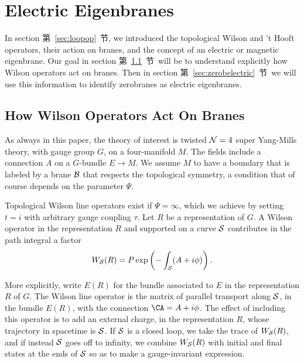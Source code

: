 
\section{Electric Eigenbranes}

\label{sec:electricbranes}

In section 第~\ref{sec:loopop}~节, we introduced the topological Wilson and 't
Hooft operators, their action on branes, and the concept of an
electric or magnetic eigenbrane. Our goal in section 第~\ref{sec:wilbranes}~节\
will be to understand explicitly how Wilson operators act on
branes.  Then in section 第~\ref{sec:zerobelectric}~节\ we will use this
information to identify zerobranes as electric eigenbranes.

\subsection{How Wilson Operators Act On Branes}

\label{sec:wilbranes}

As always in this paper, the theory of interest is  twisted ${\cal
N}=4$ super Yang-Mills theory, with gauge group $G$, on a
four-manifold $M$. The fields include a connection $A$ on a
$G$-bundle $E\to M$. We assume $M$ to have a boundary that is
labeled by a brane ${\cal B}$ that respects the topological
symmetry, a condition that of course depends on the parameter
$\Psi$.

Topological Wilson line operators exist if $\Psi=\infty$, which we
achieve by setting $t=i$ with arbitrary gauge coupling $\tau$. Let
$R$ be a representation of $G$.
 A Wilson operator in the representation $R$ and supported
 on a curve ${{\cal S}}$ contributes in the
 path integral a factor %
\setcounter{equation}{0}
\begin{equation}\label{eq:yrgy}
W_{{\cal S}}(R)=P\exp\left(-\int_{{\cal S}}(A+i\phi)
 \right).
\end{equation}

 More explicitly, write
$E(R)$ for the bundle associated to $E$ in the representation $R$
of $G$.  The Wilson line operator is the matrix of parallel
transport  along ${{\cal S}}$, in the bundle $E(R)$, with the
connection $\CA=A+i\phi$.  The effect of including this operator
is to add an external charge, in the representation $R$, whose
trajectory in spacetime is ${{\cal S}}$.  If ${{\cal S}}$ is a
closed loop, we take the trace of $W_{{\cal S}}(R)$, and if
instead ${{\cal S}}$ goes off to infinity, we combine $W_{{\cal
S}}(R)$ with initial and final states at the ends of ${{\cal S}}$
so as to make a gauge-invariant expression.

